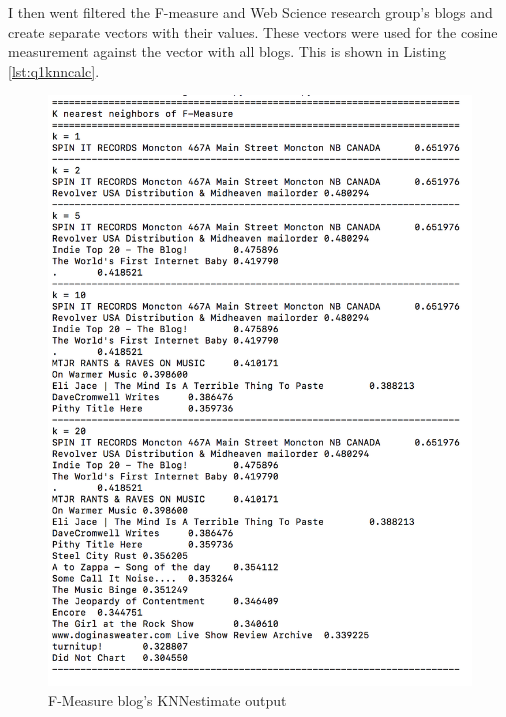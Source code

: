 \documentclass[letterpaper,11pt]{article}
\newcommand*{\srcPath}{../src}%
\begin{document}
I then went filtered the F-measure and Web Science research group's blogs and create separate vectors with their values. These vectors were used for the cosine measurement against the vector with all blogs. This is shown in Listing \ref{lst:q1knncalc}.





\clearpage
 \begin{figure}[h]
 \centering
 \includegraphics[scale=0.6]{fmeasureknn.png}
 \caption{F-Measure blog's KNNestimate output}
 \label{fig:q1knnout}
 \end{figure}
\end{document}
